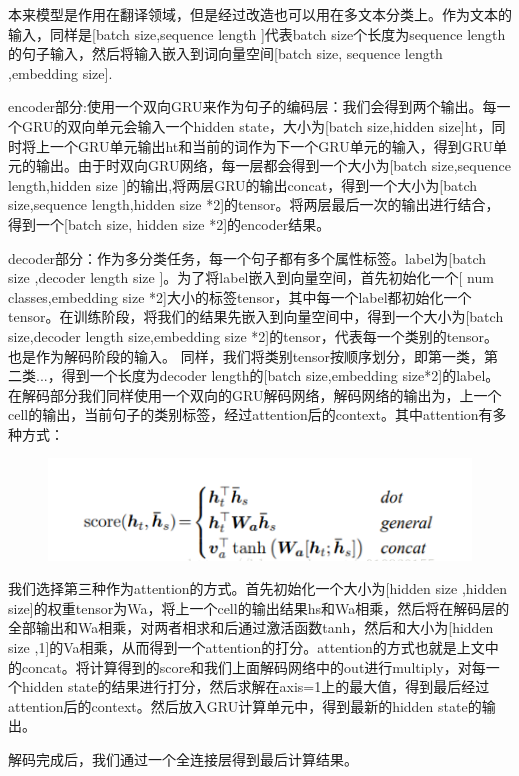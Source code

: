 \documentclass{article}
\begin{document}
本来模型是作用在翻译领域，但是经过改造也可以用在多文本分类上。作为文本的输入，同样是[batch size,sequence length ]代表batch size个长度为sequence length的句子输入，然后将输入嵌入到词向量空间[batch size, sequence length ,embedding size].

encoder部分:使用一个双向GRU来作为句子的编码层：我们会得到两个输出。每一个GRU的双向单元会输入一个hidden state，大小为[batch size,hidden size]ht，同时将上一个GRU单元输出ht和当前的词作为下一个GRU单元的输入，得到GRU单元的输出。由于时双向GRU网络，每一层都会得到一个大小为[batch size,sequence  length,hidden size  ]的输出,将两层GRU的输出concat，得到一个大小为[batch size,sequence length,hidden size *2]的tensor。将两层最后一次的输出进行结合，得到一个[batch size, hidden size *2]的encoder结果。

decoder部分：作为多分类任务，每一个句子都有多个属性标签。label为[batch size ,decoder length size ]。为了将label嵌入到向量空间，首先初始化一个[ num classes,embedding size *2]大小的标签tensor，其中每一个label都初始化一个tensor。在训练阶段，将我们的结果先嵌入到向量空间中，得到一个大小为[batch size,decoder length size,embedding size *2]的tensor，代表每一个类别的tensor。也是作为解码阶段的输入。
同样，我们将类别tensor按顺序划分，即第一类，第二类...，得到一个长度为decoder length的[batch size,embedding size*2]的label。在解码部分我们同样使用一个双向的GRU解码网络，解码网络的输出为，上一个cell的输出，当前句子的类别标签，经过attention后的context。其中attention有多种方式：

\begin{figure}
\centering
\includegraphics[width=.8\textwidth]{attention.png}
\end{figure}

我们选择第三种作为attention的方式。首先初始化一个大小为[hidden size ,hidden size]的权重tensor为Wa，将上一个cell的输出结果hs和Wa相乘，然后将在解码层的全部输出和Wa相乘，对两者相求和后通过激活函数tanh，然后和大小为[hidden size ,1]的Va相乘，从而得到一个attention的打分。attention的方式也就是上文中的concat。将计算得到的score和我们上面解码网络中的out进行multiply，对每一个hidden state的结果进行打分，然后求解在axis=1上的最大值，得到最后经过attention后的context。然后放入GRU计算单元中，得到最新的hidden state的输出。


解码完成后，我们通过一个全连接层得到最后计算结果。
\end{document}
